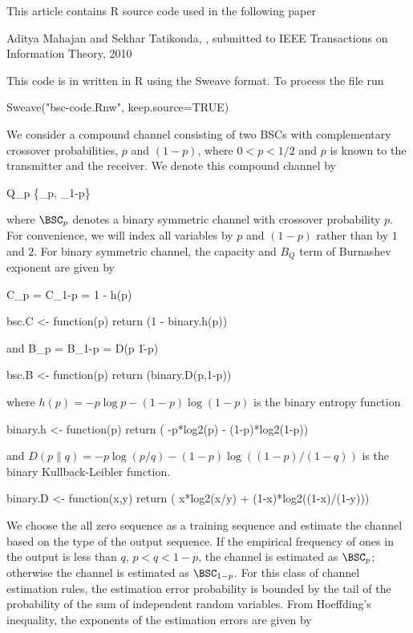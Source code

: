 This article contains R source code used in the following paper

\startframedtext
  Aditya Mahajan and Sekhar Tatikonda, , 
  submitted to IEEE Transactions on Information Theory, 2010
\stopframedtext

This code is in written in R using the Sweave format. To process
the file run

\starttyping
Sweave("bsc-code.Rnw", keep.source=TRUE)
\stoptyping

We consider a compound channel consisting of two BSCs with
complementary crossover probabilities, $p$ and $(1-p)$, where
$0 < p < 1/2$ and $p$ is known to the transmitter and the receiver.
We denote this compound channel by

\startformula \ALPHABET Q_p \DEFINED \{\BSC_p, \BSC_{1-p}\}  \stopformula

where $\BSC_p$ denotes a binary symmetric channel with crossover
probability $p$. For convenience, we will index all variables by
$p$ and $(1-p)$ rather than by $1$ and $2$. For binary symmetric
channel, the capacity and $B_Q$ term of Burnashev exponent are
given by

\startformula C_p = C_{1-p} = 1 - h(p) \stopformula

\starttyping
bsc.C <- function(p) 
{
  return (1 - binary.h(p)) 
}
\stoptyping

and \startformula B_p = B_{1-p} = D(p \| 1-p)  \stopformula

\starttyping
bsc.B <- function(p) 
{
  return (binary.D(p,1-p))
}
\stoptyping

where $h(p) = -p \log p - (1-p) \log (1-p)$ is the binary entropy
function

\starttyping
binary.h <- function(p)
{
  return ( -p*log2(p) - (1-p)*log2(1-p))
}
\stoptyping

and $D(p\|q) = -p \log (p/q) - (1-p) \log ( (1-p)/(1-q))$ is the
binary Kullback-Leibler function.

\starttyping
binary.D <- function(x,y)
{
  return ( x*log2(x/y) + (1-x)*log2((1-x)/(1-y)))
}
\stoptyping

We choose the all zero sequence as a training sequence and estimate
the channel based on the type of the output sequence. If the
empirical frequency of ones in the output is less than $q$,
$p < q < 1-p$, the channel is estimated as $\BSC_p$; otherwise the
channel is estimated as $\BSC_{1-p}$. For this class of channel
estimation rules, the estimation error probability is bounded by
the tail of the probability of the sum of independent random
variables. From Hoeffding's inequality, the exponents of the
estimation errors are given by

